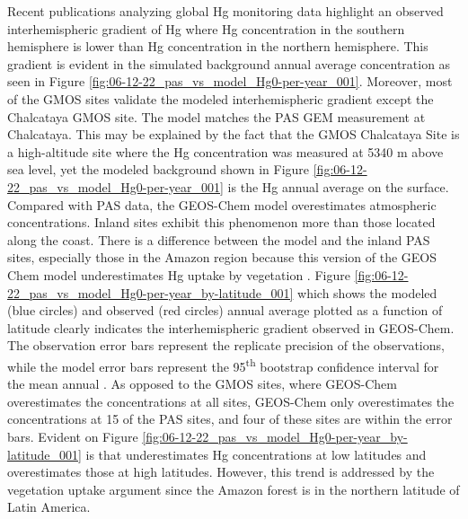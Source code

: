 \begin{flushleft}
 Recent publications analyzing global Hg monitoring data highlight an observed interhemispheric gradient of Hg where Hg concentration in the southern hemisphere is lower than Hg concentration in the northern hemisphere\cite{sprovieri_atmospheric_2016}. This gradient is evident in the simulated background annual average \hg concentration as seen in Figure \ref{fig:06-12-22_pas_vs_model_Hg0-per-year_001}. Moreover, most of the GMOS sites validate the modeled interhemispheric gradient except the Chalcataya GMOS site. The model matches the PAS GEM measurement at Chalcataya. This may be explained by the fact that the GMOS Chalcataya Site is a high-altitude site where the Hg concentration was measured at 5340 m above sea level, yet the modeled background shown in Figure \ref{fig:06-12-22_pas_vs_model_Hg0-per-year_001} is the Hg annual average on the surface. Compared with PAS data, the GEOS-Chem model overestimates atmospheric concentrations. Inland sites exhibit this phenomenon more than those located along the coast. There is a difference between the model and the inland PAS sites, especially those in the Amazon region because this version of the GEOS Chem model underestimates Hg uptake by vegetation \cite{feinberg_evaluating_2022}. Figure \ref{fig:06-12-22_pas_vs_model_Hg0-per-year_by-latitude_001} which shows the modeled (blue circles) and observed (red circles) annual average \hg plotted as a function of latitude clearly indicates the interhemispheric gradient observed in GEOS-Chem. The observation error bars represent the replicate precision of the observations, while the model error bars represent the 95\textsuperscript{th} bootstrap confidence interval for the mean annual \hg. As opposed to the GMOS sites, where GEOS-Chem overestimates the concentrations at all sites, GEOS-Chem only overestimates the concentrations at 15 of the PAS sites, and four of these sites are within the error bars. Evident on Figure \ref{fig:06-12-22_pas_vs_model_Hg0-per-year_by-latitude_001}  is that \gc underestimates Hg concentrations at low latitudes and overestimates those at high latitudes. However, this trend is addressed by the vegetation uptake argument since the Amazon forest is in the northern latitude of Latin America.
\end{flushleft}

